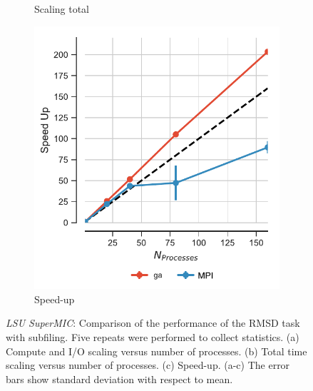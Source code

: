 \begin{figure}[!htb]
\begin{subfigure}{.3\textwidth}
    \caption{Scaling total}
    \label{fig:MPItottime-SuperMIC}
  \end{subfigure}
  \hfill
  \begin{subfigure}{.3\textwidth}
    \includegraphics[width=\linewidth]{figures/Comparison_Speed_UP_traj_splitting-SuperMIC_edited.pdf}
    \caption{Speed-up}
    \label{fig:MPIspeedup-SuperMIC}
  \end{subfigure}

  \caption{\emph{LSU SuperMIC}: Comparison of the performance of the RMSD task with subfiling.
    Five repeats were performed to collect statistics.
    (a) Compute and I/O scaling versus number of processes.
    (b) Total time scaling versus number of processes.
    (c) Speed-up.
    (a-c) The error bars show standard deviation with respect to mean.}
  \label{fig:MPIwithIO-split-SuperMIC}
\end{figure}

